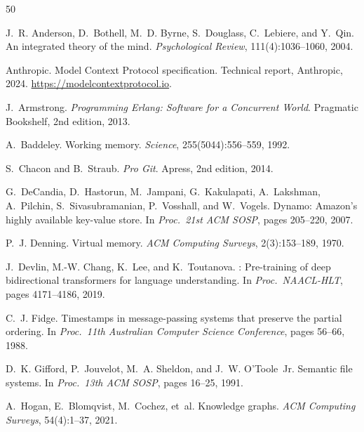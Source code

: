 \documentclass[12pt,a4paper]{article}
\theoremstyle{definition}
\begin{document}
\begin{thebibliography}{50}

J.~R. Anderson, D.~Bothell, M.~D. Byrne, S.~Douglass, C.~Lebiere, and Y.~Qin.
\newblock An integrated theory of the mind.
\newblock \emph{Psychological Review}, 111(4):1036--1060, 2004.

Anthropic.
\newblock Model Context Protocol specification.
\newblock Technical report, Anthropic, 2024.
\newblock \url{https://modelcontextprotocol.io}.

J.~Armstrong.
\newblock \emph{Programming Erlang: Software for a Concurrent World}.
\newblock Pragmatic Bookshelf, 2nd edition, 2013.

A.~Baddeley.
\newblock Working memory.
\newblock \emph{Science}, 255(5044):556--559, 1992.

S.~Chacon and B.~Straub.
\newblock \emph{Pro Git}.
\newblock Apress, 2nd edition, 2014.

G.~DeCandia, D.~Hastorun, M.~Jampani, G.~Kakulapati, A.~Lakshman, A.~Pilchin, S.~Sivasubramanian, P.~Vosshall, and W.~Vogels.
\newblock Dynamo: Amazon's highly available key-value store.
\newblock In \emph{Proc.\ 21st ACM SOSP}, pages 205--220, 2007.

P.~J. Denning.
\newblock Virtual memory.
\newblock \emph{ACM Computing Surveys}, 2(3):153--189, 1970.

J.~Devlin, M.-W. Chang, K.~Lee, and K.~Toutanova.
: Pre-training of deep bidirectional transformers for language understanding.
\newblock In \emph{Proc.\ NAACL-HLT}, pages 4171--4186, 2019.

C.~J. Fidge.
\newblock Timestamps in message-passing systems that preserve the partial ordering.
\newblock In \emph{Proc.\ 11th Australian Computer Science Conference}, pages 56--66, 1988.

D.~K. Gifford, P.~Jouvelot, M.~A. Sheldon, and J.~W. O'Toole~Jr.
\newblock Semantic file systems.
\newblock In \emph{Proc.\ 13th ACM SOSP}, pages 16--25, 1991.

A.~Hogan, E.~Blomqvist, M.~Cochez, et~al.
\newblock Knowledge graphs.
\newblock \emph{ACM Computing Surveys}, 54(4):1--37, 2021.


\end{thebibliography}
\end{document}
